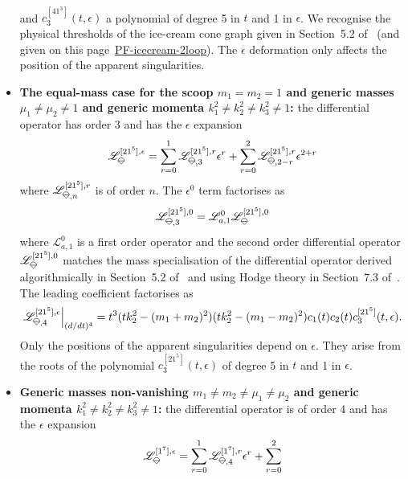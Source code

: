 \documentclass[a4paper,12pt]{article}
\numberwithin{equation}{section}
\numberwithin{figure}{section}
\newcommand{\IceCream}{	\begin{tikzpicture}[scale=0.05]
	\draw[color = black, fill=none] (2,0) arc(0:180:2);
		\draw [black] (-2,0) to (2,0);
		\draw [black] (-2,0) to (0,-2);
                	\draw [black] (2,0) to (0,-2);
	\end{tikzpicture}}
\begin{document}
\begin{itemize}
\begin{multline}
	\end{multline}
	and $c^{[41^3]}_3(t,\epsilon)$ a polynomial of  degree 5 in $t$ and 1 in
	$\epsilon$. We recognise the physical thresholds of the ice-cream
	cone graph given in Section~5.2 of~\cite{Lairez:2022zkj} (and given
	on this
	page~\href{https://nbviewer.org/github/pierrevanhove/PicardFuchs/blob/main/PF-icecream-2loop.ipynb}{PF-icecream-2loop}). The
	$\epsilon$ deformation only affects the position of the apparent singularities. 
	\item \textbf{The equal-mass case for the scoop
		$m_1=m_2=1$ and generic masses $\mu_1\neq\mu_2\neq1$ and generic
		momenta  $k_1^2\neq k_2^2\neq
		k_3^2\neq 1$:}  the differential operator has order 3 and has the
	$\epsilon$ expansion
	\begin{equation}
		\mathscr{L}_{\IceCream}^{[21^5],\epsilon}=\sum_{r=0}^1
		\mathscr{L}_{\IceCream,3}^{[21^5],r} \epsilon^r+ \sum_{r=0}^2   \mathscr{L}_{\IceCream,2-r}^{[21^5],r} \epsilon^{2+r}
	\end{equation}
	where $ \mathscr{L}_{\IceCream,n}^{[21^5],r}$  is of order $n$. The
	$\epsilon^0$ term factorises as
	\begin{equation}
		\mathscr{L}_{\IceCream,3}^{[21^5],0}=\mathscr{L}_{a,1}^0 \mathscr{L}_{\IceCream}^{[21^5] ,0      }
	\end{equation}
	where $\mathscr{L}_{a,1}^0$ is a first order operator and the second order
	differential operator  $\mathscr{L}_{\IceCream}^{[21^5] ,0}
	$ matches the mass specialisation of the differential
	operator derived algorithmically in Section~5.2
	of~\cite{Lairez:2022zkj} and using Hodge theory in
	Section~7.3 of~\cite{Doran:2023yzu}.
	The leading coefficient factorises as
	\begin{equation}
		\mathscr{L}_{\IceCream,4}^{[21^5],\epsilon}\Big|_{(d/dt)^4}=t^3
		(tk_2^2-(m_1+m_2)^2)(tk_2^2-(m_1-m_2)^2) c_1(t)
		c_2(t) c^{[21^5]}_3(t,\epsilon)   .
	\end{equation}
	Only the positions of the apparent singularities 
	 depend on $\epsilon$. They arise from the
	roots of the polynomial $c^{[21^5]}_3(t,\epsilon)   $ of
	degree 5 in $t$ and 1 in $\epsilon$.
	\item \textbf{Generic masses non-vanishing
		$m_1\neq m_2\neq\mu_1\neq\mu_2$ and generic
		momenta  $k_1^2\neq k_2^2\neq
		k_3^2\neq 1$:}  the differential operator is of order 4 and has the
	$\epsilon$ expansion
	\begin{equation}
		\mathscr{L}_{\IceCream}^{[1^7],\epsilon}=\sum_{r=0}^1
		\mathscr{L}_{\IceCream,4}^{[1^7],r} \epsilon^r+ \sum_{r=0}^2

\end{equation}
\end{itemize}
\end{document}
